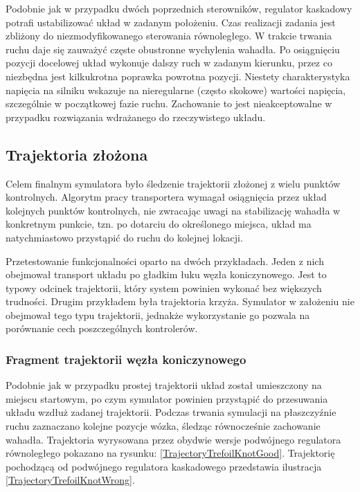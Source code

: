 \documentclass[12pt, oneside]{report}
\theoremstyle{definition}
\begin{document}
Podobnie jak w przypadku dwóch poprzednich sterowników, regulator kaskadowy potrafi ustabilizować układ w zadanym położeniu. Czas realizacji zadania jest zbliżony do niezmodyfikowanego sterowania równoległego. W trakcie trwania ruchu daje się zauważyć częste obustronne wychylenia wahadła. Po osiągnięciu pozycji docelowej układ wykonuje dalszy ruch w zadanym kierunku, przez co niezbędna jest kilkukrotna poprawka powrotna pozycji. Niestety charakterystyka napięcia na silniku wskazuje na nieregularne (często skokowe) wartości napięcia, szczególnie w początkowej fazie ruchu. Zachowanie to jest nieakceptowalne w przypadku rozwiązania wdrażanego do rzeczywistego układu. 

\subsection{Trajektoria złożona}
Celem finalnym symulatora było śledzenie trajektorii złożonej z wielu punktów kontrolnych. Algorytm pracy transportera wymagał osiągnięcia przez układ kolejnych punktów kontrolnych, nie zwracając uwagi na stabilizację wahadła w konkretnym punkcie, tzn. po dotarciu do określonego miejsca, układ ma natychmiastowo przystąpić do ruchu do kolejnej lokacji. 

Przetestowanie funkcjonalności oparto na dwóch przykładach. Jeden z nich obejmował transport układu po gładkim łuku węzła koniczynowego. Jest to typowy odcinek trajektorii, który system powinien wykonać bez większych trudności. Drugim przykładem była trajektoria krzyża. Symulator w założeniu nie obejmował tego typu trajektorii, jednakże wykorzystanie go pozwala na porównanie cech poszczególnych kontrolerów. 

\subsubsection{Fragment trajektorii węzła koniczynowego}
Podobnie jak w przypadku prostej trajektorii układ został umieszczony na miejscu startowym, po czym symulator powinien przystąpić do przesuwania układu wzdłuż zadanej trajektorii. Podczas trwania symulacji na płaszczyźnie ruchu zaznaczano kolejne pozycje wózka, śledząc równocześnie zachowanie wahadła. Trajektoria wyrysowana przez obydwie wersje podwójnego regulatora równoległego pokazano na rysunku: \ref{TrajectoryTrefoilKnotGood}. Trajektorię pochodzącą od podwójnego regulatora kaskadowego przedstawia ilustracja \ref{TrajectoryTrefoilKnotWrong}.
\end{document}

